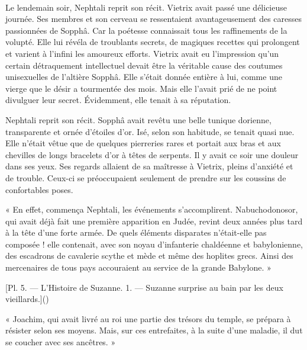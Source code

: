 \documentclass[a4paper, 11pt, oneside, polutonikogreek, french]{article}
\begin{document}
\paragraph{}
Le lendemain soir, Nephtali reprit son récit. Vietrix avait passé une délicieuse journée. Ses membres et son cerveau se ressentaient avantageusement des caresses passionnées de Sopphâ. Car la poétesse connaissait tous les raffinements de la volupté. Elle lui révéla de troublants secrets, de magiques recettes qui prolongent et varient à l'infini les amoureux efforts. Vietrix avait eu l'impression qu'un certain détraquement intellectuel devait être la véritable cause des coutumes unisexuelles de l'altière Sopphâ. Elle s'était donnée entière à lui, comme une vierge que le désir a tourmentée des mois. Mais elle l'avait prié de ne point divulguer leur secret. Évidemment, elle tenait à sa réputation.

\bigskip
\centerline{\EightStarTaper}
\centerline{\EightStarTaper\EightStarTaper}
\bigskip

Nephtali reprit son récit. Sopphâ avait revêtu une belle tunique dorienne, transparente et ornée d'étoiles d'or. Isé, selon son habitude, se tenait quasi nue. Elle n'était vêtue que de quelques pierreries rares et portait aux bras et aux chevilles de longs bracelets d'or à têtes de serpents. Il y avait ce soir une douleur dans ses yeux. Ses regards allaient de sa maîtresse à Vietrix, pleins d'anxiété et de trouble. Ceux-ci se préoccupaient seulement de prendre sur les coussins de confortables poses.

\bigskip
\centerline{\EightStarTaper}
\centerline{\EightStarTaper\EightStarTaper}
\bigskip

« En effet, commença Nephtali, les événements s'accomplirent. Nabuchodonosor, qui avait déjà fait une première apparition en Judée, revint deux années plus tard à la tête d'une forte armée. De quels éléments disparates n'était-elle pas composée ! elle contenait, avec son noyau d'infanterie chaldéenne et babylonienne, des escadrons de cavalerie scythe et mède et même des hoplites grecs. Ainsi des mercenaires de tous pays accouraient au service de la grande Babylone. »

[Pl. 5. --- L'Histoire de Suzanne. 1. --- Suzanne surprise au bain par les deux vieillards.]()

« Joachim, qui avait livré au roi une partie des trésors du temple, se prépara à résister selon ses moyens. Mais, sur ces entrefaites, à la suite d'une maladie, il dut se coucher avec ses ancêtres. »
\end{document}
